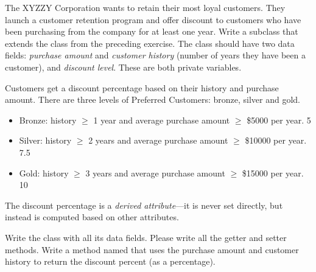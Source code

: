 \begin{exercise}
The XYZZY Corporation wants to retain their most loyal customers. They launch a customer retention program and offer discount to customers who have been purchasing from the company for at least one year.
Write a subclass  that extends the  class from the preceding exercise. The  class should have two data fields: {\em purchase amount} and {\em customer history} (number of years they have been a customer), and {\em discount level}. These are both private variables.

Customers get a discount percentage based on their history and purchase amount. There are three levels of Preferred Customers: bronze, silver and gold.
\begin{itemize}
\item Bronze: history $\geq$ 1 year and average purchase amount $\geq$ \$5000 per year.  5%
\item Silver:  history $\geq$ 2 years and average purchase amount $\geq$ \$10000 per year. 7.5%
\item Gold:  history $\geq$ 3 years and average purchase amount $\geq$ \$15000 per year. 10%
\end{itemize}

The discount percentage is a {\em derived attribute}---it is never set directly, but instead is computed based on other attributes.

Write the  class with all its data fields. Please write all the getter and setter methods.  Write a method named  that uses the purchase amount and customer history to return the discount percent (as a percentage).
\end{exercise}


